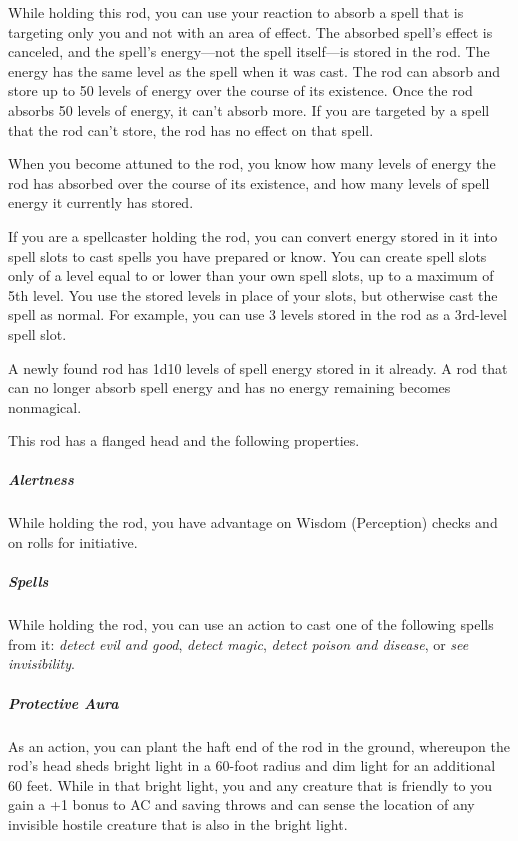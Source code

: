 \documentclass[10pt,a4paper,twoside,bg=print,twocolumn,openany,nodeprecatedcode]{dndbook}
\begin{document}
While holding this rod, you can use your reaction to absorb a spell that is targeting only you and not with an area of effect. The absorbed spell's effect is canceled, and the spell's energy—not the spell itself—is stored in the rod. The energy has the same level as the spell when it was cast. The rod can absorb and store up to 50 levels of energy over the course of its existence. Once the rod absorbs 50 levels of energy, it can't absorb more. If you are targeted by a spell that the rod can't store, the rod has no effect on that spell.

When you become attuned to the rod, you know how many levels of energy the rod has absorbed over the course of its existence, and how many levels of spell energy it currently has stored.

If you are a spellcaster holding the rod, you can convert energy stored in it into spell slots to cast spells you have prepared or know. You can create spell slots only of a level equal to or lower than your own spell slots, up to a maximum of 5th level. You use the stored levels in place of your slots, but otherwise cast the spell as normal. For example, you can use 3 levels stored in the rod as a 3rd-level spell slot.

A newly found rod has 1d10 levels of spell energy stored in it already. A rod that can no longer absorb spell energy and has no energy remaining becomes nonmagical.

This rod has a flanged head and the following properties.

\subparagraph{Alertness}
While holding the rod, you have advantage on Wisdom (Perception) checks and on rolls for initiative.

\subparagraph{Spells}
While holding the rod, you can use an action to cast one of the following spells from it: \textit{detect evil and good}, \textit{detect magic}, \textit{detect poison and disease}, or \textit{see invisibility}.

\subparagraph{Protective Aura}
As an action, you can plant the haft end of the rod in the ground, whereupon the rod's head sheds bright light in a 60-foot radius and dim light for an additional 60 feet. While in that bright light, you and any creature that is friendly to you gain a +1 bonus to AC and saving throws and can sense the location of any invisible hostile creature that is also in the bright light.
\end{document}
